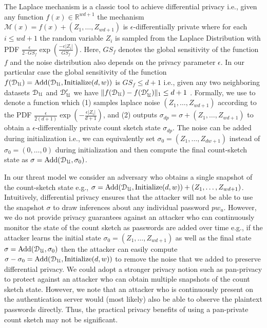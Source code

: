  The Laplace mechanism is a classic tool to achieve differential privacy {i.e., given any function $f(x) \in \mathbb{R}^{wd+1}$ the mechanism $\mathcal{M}(x) = f(x) + (Z_1,\ldots,Z_{wd+1})$ is $\epsilon$-differentially private where for each $i \leq wd+1$ the random variable $Z_i$ is sampled from the Laplace Distribution with PDF $\frac{\epsilon}{2 \cdot GS_f} \exp\left(  \frac{- \epsilon| Z_i|}{GS_f}\right)$. Here,  $GS_f$ denotes the global sensitivity of the function $f$ and the noise distribution also depends on the privacy parameter $\epsilon$.  In our particular case the global sensitivity of the function $f(\mathcal{D}_{{\mathcal{U}}}) = \text{Add}(\mathcal{D}_{{\mathcal{U}}}, \text{Initialize}(d,w))$ is  $GS_f \leq d+1$ i.e., given any two neighboring datasets $\mathcal{D}_{{\mathcal{U}}}$ and $\mathcal{D}_{{\mathcal{U}}}'$ we have $\|f(\mathcal{D}_{{\mathcal{U}}}) - f(\mathcal{D}_{{\mathcal{U}}}') \|_1 \leq d+1$ . Formally, we use  to denote a function which (1) samples laplace noise $(Z_1,\ldots,Z_{wd+1})$ according to the PDF $\frac{\epsilon}{2(d+1)} \exp\left( -\frac{\epsilon | Z_i|}{d+1}\right)$, and (2) outputs $\sigma_{dp}= \sigma + (Z_1,\ldots,Z_{wd+1})$ to obtain a $\epsilon$-differentially private count sketch state $\sigma_{dp}$. The noise can be added during initialization i.e., we can equivalently set $\sigma_0 = (Z_1,\ldots, Z_{dw+1})$ instead of $\sigma_0 = (0,\ldots,0)$  during initialization and then compute the final count-sketch state as $\sigma=\text{Add}(\mathcal{D}_{{\mathcal{U}}}, \sigma_0)$.   }


 {In our threat model we consider an adversary who obtains a single snapshot of the count-sketch state e.g., $\sigma = \text{Add}(\mathcal{D}_{{\mathcal{U}}}, \text{Initialize}(d,w)) + (Z_1,\ldots, Z_{wd+1})$. Intuitively, differential privacy ensures that the attacker will not be able to use the snapshot $\sigma$ to draw inferences about any individual password $pw_u$. However, we do not provide privacy guarantees against an attacker who can continuously monitor the state of the count sketch as passwords are added over time e.g., if the attacker learns the initial state $\sigma_0 =  (Z_1,\ldots, Z_{wd+1})$ as well as the final state $\sigma = \text{Add}(\mathcal{D}_{{\mathcal{U}}}, \sigma_0)$ then the attacker can easily compute $\sigma-\sigma_0 = \text{Add}(\mathcal{D}_{{\mathcal{U}}},\text{Initialize}(d,w))$ to remove the noise that we added to preserve differential privacy. We could adopt a stronger privacy notion such as pan-privacy \cite{ITCS:DNPRY10} to protect against an attacker who can obtain multiple snapshots of the count sketch state. However, we note that an attacker who is continuously present on the authentication server would (most likely) also be able to observe the plaintext passwords directly. Thus, the practical privacy benefits of using a pan-private count sketch may not be significant.    }


